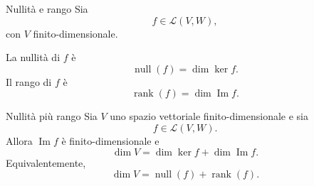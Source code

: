 \documentclass[a4paper]{article}
\begin{document}
\begin{snippetdefinition}{Nullità e rango}
    Sia
    \[
        f\in\mathcal{L}(V,W),
    \]
    con \(V\) finito-dimensionale.

    La nullità di \(f\) è
    \[
        \operatorname{null}(f)=\dim\ker f.
    \]
    Il rango di \(f\) è
    \[
        \operatorname{rank}(f)=\dim\operatorname{Im}f.
    \]
\end{snippetdefinition}

\begin{snippettheorem}{Nullità più rango}
    Sia \(V\) uno spazio vettoriale finito-dimensionale e sia
    \[
        f\in\mathcal{L}(V,W).
    \]
    Allora \(\operatorname{Im}f\) è finito-dimensionale e
    \[
        \dim V
        =
        \dim\ker f+\dim\operatorname{Im}f.
    \]
    Equivalentemente,
    \[
        \dim V
        =
        \operatorname{null}(f)+\operatorname{rank}(f).
    \]
\end{snippettheorem}
\end{document}

